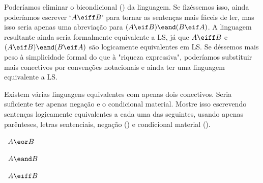 \problempart
\label{pr.altConnectives}
Poderíamos eliminar o bicondicional (\eiff) da linguagem. Se fizéssemos isso, ainda poderíamos escrever `$A\eiff B$' para tornar as sentenças mais fáceis de ler, mas isso seria apenas uma abreviação para $(A\eif B) \eand (B\eif A)$. A linguagem resultante ainda seria formalmente equivalente a LS, já que $A\eiff B$ e $(A\eif B) \eand (B\eif A)$ são logicamente equivalentes em LS. Se déssemos mais peso à simplicidade formal do que à "riqueza expressiva", poderíamos substituir mais conectivos por convenções notacionais e ainda ter uma linguagem equivalente a LS.

Existem várias linguagens equivalentes com apenas dois conectivos. Seria suficiente ter apenas negação e o condicional material. Mostre isso escrevendo sentenças logicamente equivalentes a cada uma das seguintes, usando apenas parênteses, letras sentenciais, negação (\enot) e condicional material (\eif).
\begin{earg}
\item\leftsolutions\ $A\eor B$
\item\leftsolutions\ $A\eand B$
\item\leftsolutions\ $A\eiff B$
\end{earg}

